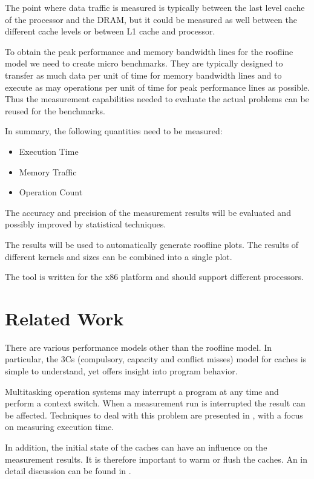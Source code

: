 \documentclass[a4paper,12pt]{report}
\begin{document}
The point where data traffic is measured is typically between the last level
cache of the processor and the DRAM, but it could be measured as well between
the different cache levels or between L1 cache and processor.

To obtain the peak performance and memory bandwidth lines for the roofline model
we need to create micro benchmarks. They are typically designed to transfer as
much data per unit of time for memory bandwidth lines and to execute as may
operations per unit of time for peak performance lines as possible. Thus the
measurement capabilities needed to evaluate the actual problems can be reused
for the benchmarks.

In summary, the following quantities need to be measured:
\begin{itemize}
\item Execution Time
\item Memory Traffic
\item Operation Count
\end{itemize}

The accuracy and precision of the measurement results will be evaluated and
possibly improved by statistical techniques.

The results will be used to automatically generate roofline plots. The
results of different kernels and sizes can be combined into a single plot.

The tool is written for the x86 platform and should support different
processors. 
 
\section{Related Work}
There are various performance models other than the roofline model.
\cite{Asanovic:EECS-2006-183} \cite{Boyd94ahierarchical} In particular, the 3Cs
(compulsory, capacity and conflict misses) model for caches
\cite{Hill:1989:EAC:76602.76603} is simple to understand, yet offers
insight into program behavior.

Multitasking operation systems may interrupt a program at any time and
perform a context switch. When a measurement run is interrupted the result can
be affected. Techniques to deal with this problem are
presented in \cite{ComSysProgPersp}, with a focus on measuring execution time.

In addition, the initial state of the caches can have an influence on the
measurement results. It is therefore important to warm or flush the caches. An
in detail discussion can be found in \cite{Whaley:2008:AAC:1462062.1462065}.
\end{document}
